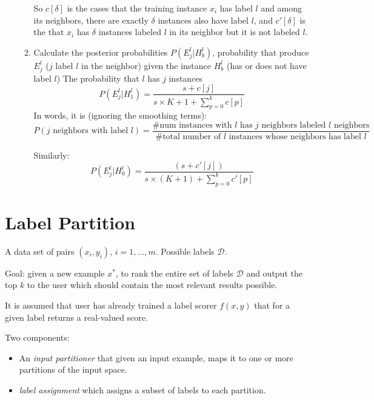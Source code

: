 \begin{enumerate}
\begin{enumerate}
                So $c[\delta]$ is the cases that the training instance
                $x_i$ has label $l$ and among its neighbors, there are exactly
                $\delta$ instances also have label $l$, and $c'[\delta]$
                is the that $x_i$ has $\delta$ instances labeled $l$ in
                its neighbor but it is not labeled $l$.
            \item Calculate the posterior probabilities $P(E_j^l|H_b^l)$,
                probability that produce $E_j^l$ ($j$ label $l$ in
                the neighbor) given the instance $H_b^l$ (has or does not
                have label $l$)
                The probability that $l$ has $j$ instances
                \begin{equation}
                    P(E_j^l|H_1^l) = \frac{s + c[j]}{s\times{K+1} +
                    \sum_{p=0}^k c[p]}
                \end{equation}
                In words, it is (ignoring the smoothing terms):
                \[ P(\mbox{$j$ neighbors with
                label $l$}) = \frac{\#\mbox{num instances with $l$ has
                $j$ neighbors labeled $l$ neighbors}}{\#\mbox{total
                    number of $l$ instances whose
                neighbors has label $l$}} \]
                
                Similarly:
                \begin{equation}
                    P(E_j^l|H_0^l) = \frac{(s+ c'[j])}{s\times(K+1) +
                        \sum_{p=0}^k c'[p]} \end{equation}
        \end{enumerate}
\end{enumerate}

\section{Label Partition}
A data set of pairs $(x_i, y_i)$, $i = 1, \dots, m$. Possible labels
$\mathcal{D}$.

Goal: given a new example $x^*$, to rank the entire set of labels
$\mathcal{D}$ and output the top $k$ to the user which should contain the
most relevant results possible.

It is assumed that user has already trained a label scorer $f(x,y)$ that
for a given label returns a real-valued score.

Two components:
\begin{itemize}
    \item An \emph{input partitioner} that given an input example, maps it
        to one or more partitions of the input space.
    \item \emph{label assignment} which assigns a subset of labels to each
        partition.
\end{itemize}

